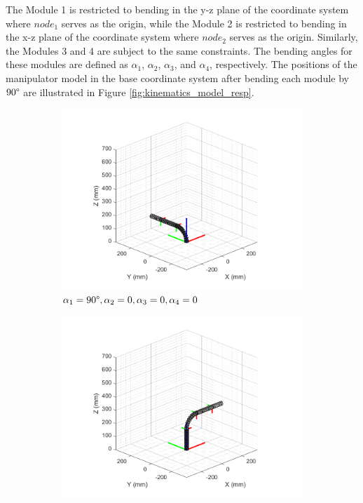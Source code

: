 \noindent The Module 1 is restricted to bending in the y-z plane of the coordinate system where $node_1$ serves as 
the origin, while the Module 2 is restricted to bending in the x-z plane of the coordinate system where $node_2$ 
serves as the origin. Similarly, the Modules 3 and 4 are subject to the same constraints. The bending angles for 
these modules are defined as $\alpha_1$, $\alpha_2$, $\alpha_3$, and $\alpha_4$, respectively. The positions of the 
manipulator model in the base coordinate system after bending each module by $90 \degree$ are illustrated in Figure 
\ref{fig:kinematics_model_resp}.
\begin{figure}[H] %
    \centering 
    \captionsetup{labelsep=colon}
    \begin{subfigure}{0.48\textwidth} %
        \centering
        \includegraphics[width=\linewidth]{Image/MATLAB/manipulator_90_0_0_0.png}
        \caption{$\alpha_1=90 \degree,\alpha_2=0,\alpha_3=0,\alpha_4=0$}
    \end{subfigure}
    \hfill
    \begin{subfigure}{0.48\textwidth} %
        \centering
        \includegraphics[width=\linewidth]{Image/MATLAB/manipulator_0_90_0_0.png}

\end{subfigure}
\end{figure}
